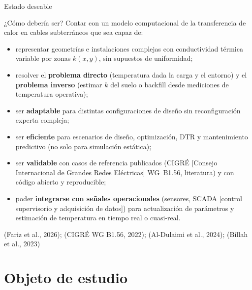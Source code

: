 \documentclass[aspectratio=169]{beamer}
\newcommand{\refcite}[1]{{\footnotesize\color{gray!70!black} #1}}
\begin{document}
\begin{frame}{Estado deseable}
\begin{exampleblock}{¿Cómo debería ser?}
\justifying\small
Contar con un modelo computacional de la transferencia de calor en cables
subterráneos que sea capaz de:
\begin{itemize}[leftmargin=*]
    \item representar geometrías e instalaciones complejas con conductividad
          térmica variable por zonas $k(x,y)$, sin supuestos de uniformidad;
    \item resolver el \textbf{problema directo} (temperatura dada la carga y
          el entorno) y el \textbf{problema inverso} (estimar $k$ del suelo o
          backfill desde mediciones de temperatura operativa);
    \item ser \textbf{adaptable} para distintas configuraciones de diseño sin
          reconfiguración experta compleja;
    \item ser \textbf{eficiente} para escenarios de diseño, optimización,
          DTR y mantenimiento predictivo (no solo para simulación estática);
    \item ser \textbf{validable} con casos de referencia publicados
          (CIGRÉ [Consejo Internacional de Grandes Redes Eléctricas] WG~B1.56, literatura) y con código abierto y reproducible;
    \item poder \textbf{integrarse con señales operacionales} (sensores,
          SCADA [control supervisorio y adquisición de datos]) para actualización de parámetros y estimación de temperatura
          en tiempo real o cuasi-real.
\end{itemize}
\end{exampleblock}
\vspace{0.2em}
\refcite{(Fariz et al., 2026); (CIGRÉ WG B1.56, 2022); (Al-Dulaimi et al., 2024);
(Billah et al., 2023)}
\end{frame}


\section{Objeto de estudio}
\end{document}
